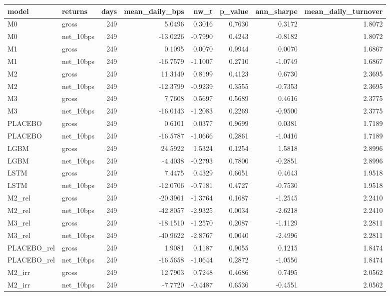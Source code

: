 \begin{tabular}{llrrrrrr}
\toprule
model & returns & days & mean\_daily\_bps & nw\_t & p\_value & ann\_sharpe & mean\_daily\_turnover \\
\midrule
M0 & gross & 249 & 5.0496 & 0.3016 & 0.7630 & 0.3172 & 1.8072 \\
M0 & net\_10bps & 249 & -13.0226 & -0.7990 & 0.4243 & -0.8182 & 1.8072 \\
M1 & gross & 249 & 0.1095 & 0.0070 & 0.9944 & 0.0070 & 1.6867 \\
M1 & net\_10bps & 249 & -16.7579 & -1.1007 & 0.2710 & -1.0749 & 1.6867 \\
M2 & gross & 249 & 11.3149 & 0.8199 & 0.4123 & 0.6730 & 2.3695 \\
M2 & net\_10bps & 249 & -12.3799 & -0.9239 & 0.3555 & -0.7353 & 2.3695 \\
M3 & gross & 249 & 7.7608 & 0.5697 & 0.5689 & 0.4616 & 2.3775 \\
M3 & net\_10bps & 249 & -16.0143 & -1.2083 & 0.2269 & -0.9500 & 2.3775 \\
PLACEBO & gross & 249 & 0.6101 & 0.0377 & 0.9699 & 0.0381 & 1.7189 \\
PLACEBO & net\_10bps & 249 & -16.5787 & -1.0666 & 0.2861 & -1.0416 & 1.7189 \\
LGBM & gross & 249 & 24.5922 & 1.5324 & 0.1254 & 1.5818 & 2.8996 \\
LGBM & net\_10bps & 249 & -4.4038 & -0.2793 & 0.7800 & -0.2851 & 2.8996 \\
LSTM & gross & 249 & 7.4475 & 0.4329 & 0.6651 & 0.4643 & 1.9518 \\
LSTM & net\_10bps & 249 & -12.0706 & -0.7181 & 0.4727 & -0.7530 & 1.9518 \\
M2\_rel & gross & 249 & -20.3961 & -1.3764 & 0.1687 & -1.2545 & 2.2410 \\
M2\_rel & net\_10bps & 249 & -42.8057 & -2.9325 & 0.0034 & -2.6218 & 2.2410 \\
M3\_rel & gross & 249 & -18.1510 & -1.2570 & 0.2087 & -1.1129 & 2.2811 \\
M3\_rel & net\_10bps & 249 & -40.9622 & -2.8767 & 0.0040 & -2.4996 & 2.2811 \\
PLACEBO\_rel & gross & 249 & 1.9081 & 0.1187 & 0.9055 & 0.1215 & 1.8474 \\
PLACEBO\_rel & net\_10bps & 249 & -16.5658 & -1.0644 & 0.2872 & -1.0556 & 1.8474 \\
M2\_irr & gross & 249 & 12.7903 & 0.7248 & 0.4686 & 0.7495 & 2.0562 \\
M2\_irr & net\_10bps & 249 & -7.7720 & -0.4487 & 0.6536 & -0.4551 & 2.0562 \\

\end{tabular}
